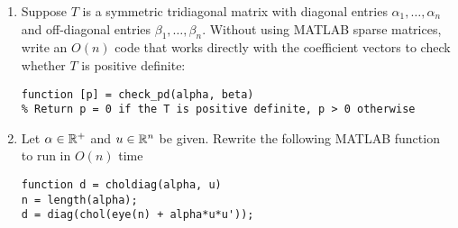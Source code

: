 \documentclass[12pt, leqno]{article}
\begin{document}
\begin{enumerate}
\item
  Suppose $T$ is a symmetric tridiagonal matrix with diagonal entries
  $\alpha_1, \ldots, \alpha_n$ and off-diagonal entries $\beta_1,
  \ldots, \beta_n$.  Without using MATLAB sparse matrices, write an
  $O(n)$ code that works directly with the coefficient vectors to
  check whether $T$ is positive definite:
\begin{verbatim}
function [p] = check_pd(alpha, beta)
% Return p = 0 if the T is positive definite, p > 0 otherwise
\end{verbatim}
  
\item
  Let $\alpha \in \mathbb{R}^+$ and $u \in \mathbb{R}^n$ be given.
  Rewrite the following MATLAB function to run in $O(n)$ time
\begin{verbatim}
function d = choldiag(alpha, u)
n = length(alpha);
d = diag(chol(eye(n) + alpha*u*u'));
\end{verbatim}

\end{enumerate}
\end{document}
